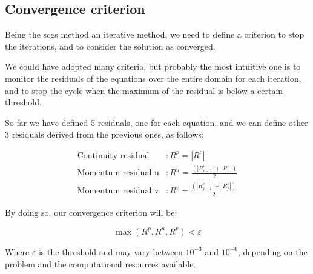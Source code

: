 \subsection{Convergence criterion}
\label{sec:convergence_criterion}

Being the \acrshort{scgs} method an iterative method, we need to define a criterion to stop the iterations, and to consider the solution as converged.

We could have adopted many criteria, but probably the most intuitive one is to monitor the residuals of the equations over the entire domain for each iteration, and to stop the cycle when the maximum of the residual is below a certain threshold.

So far we have defined 5 residuals, one for each equation, and we can define other 3 residuals derived from the previous ones, as follows:

\begin{equation}
    \begin{aligned}
        \text{Continuity residual} & : R^p = | R^c |                                               \\
        \text{Momentum residual u} & : R^u = \frac{\left( | R_{i-1}^u | + | R_{i}^u | \right) }{2} \\
        \text{Momentum residual v} & : R^v = \frac{\left( | R_{j-1}^v | + | R_{j}^v | \right) }{2}
    \end{aligned}
\end{equation}

By doing so, our convergence criterion will be:

\begin{equation}
    \max \left( R^p, R^u, R^v \right) < \varepsilon
\end{equation}

Where $\varepsilon$ is the threshold and may vary between $10^{-3}$ and $10^{-6}$, depending on the problem and the computational resources available.